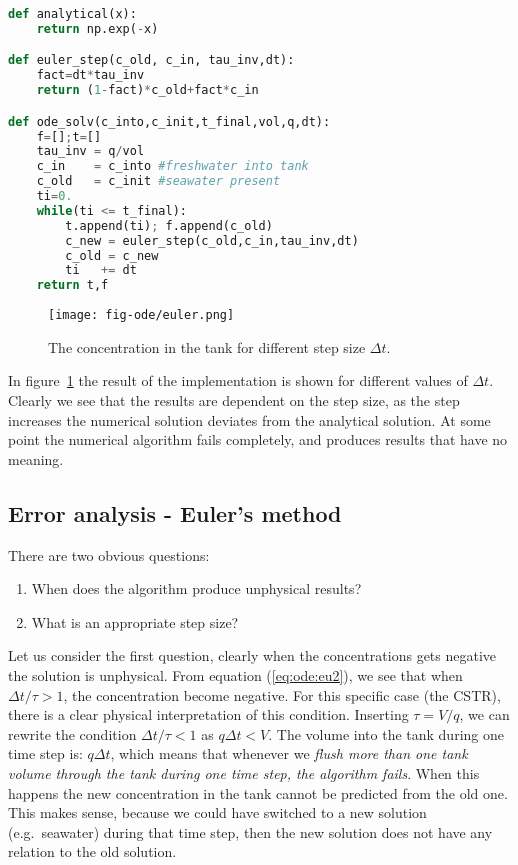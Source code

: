 \documentclass[graybox,sectrefs,envcountresetchap,open=right,final]{svmonodo}
\begin{document}
\begin{lstlisting}[language=python,style=blue1]
def analytical(x):
    return np.exp(-x)

def euler_step(c_old, c_in, tau_inv,dt):
    fact=dt*tau_inv
    return (1-fact)*c_old+fact*c_in

def ode_solv(c_into,c_init,t_final,vol,q,dt):
    f=[];t=[]
    tau_inv = q/vol
    c_in    = c_into #freshwater into tank
    c_old   = c_init #seawater present 
    ti=0.
    while(ti <= t_final):
        t.append(ti); f.append(c_old)
        c_new = euler_step(c_old,c_in,tau_inv,dt)     
        c_old = c_new
        ti   += dt
    return t,f

\end{lstlisting}


\begin{figure}[!ht]  %
  \centerline{\texttt{[image: fig-ode/euler.png]}}
  \caption{
  The concentration in the tank for different step size $\Delta t$. \label{fig:ode:euler}
  }
\end{figure}

In figure~\ref{fig:ode:euler} the result of the implementation is shown for different values of $\Delta t$.
Clearly we see that the results are dependent on the step size, as the step increases the numerical solution deviates from the analytical solution. At some point the 
numerical algorithm fails completely, and produces results that have no meaning. 

\subsection{Error analysis - Euler's method}
There are two obvious questions:
\begin{enumerate}
\item When does the algorithm produce unphysical results?  

\item What is an appropriate step size? 
\end{enumerate}

\noindent
Let us consider the first question, clearly when the concentrations gets negative the solution is unphysical. From equation (\ref{eq:ode:eu2}), 
we see that when $\Delta t/\tau > 1$, the concentration 
become negative. For this specific case (the CSTR), there is a clear physical interpretation of this condition. Inserting $\tau=V/q$, we can rewrite
the condition $\Delta t/\tau <1$ as $q\Delta t < V$. The volume into the tank during one time step is: $q\Delta t$, which means that
whenever we \emph{flush more than one tank volume through the tank during one time step, the algorithm fails}.
When this happens the new concentration in the tank cannot be predicted from the old one. This makes sense, because we could have switched to a
new solution (e.g.~seawater) during that time step, then the new solution does not have any relation to the old solution. 
\end{document}
